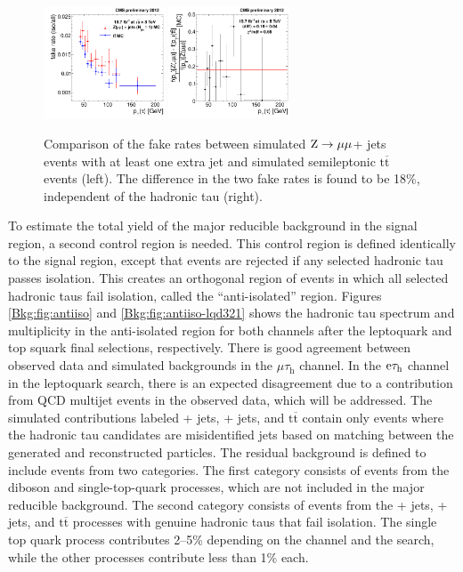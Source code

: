 \documentclass[12pt]{thesis}  %
\newcommand{\tauh}{\ensuremath{\tau_{\text{h}}}\xspace}
\newcommand{\Pe}{\ensuremath{\cmsSymbolFace{e}}\xspace}
\newcommand{\mutau}{\ensuremath{\mu\tauh}\xspace}
\newcommand{\etau}{\ensuremath{\Pe\tauh}\xspace}
\renewcommand{\ttbar}{\ensuremath{\mathrm{t}\overline{\mathrm{t}}}\xspace}
\newcommand{\ra}{\ensuremath{\rightarrow}}%
\newcommand{\Zmm}{\ensuremath{\Z \ra \mu\mu}\xspace}%
\begin{document}
\begin{figure}[hbt]
  \begin{center}
    \includegraphics[width=0.32\textwidth]{figures/bkgEstim/ttbar_fr_comp_final.pdf}
    \includegraphics[width=0.32\textwidth]{figures/bkgEstim/tfr_diff_ttbar_incl.pdf}
    \caption{Comparison of the fake rates between simulated \Zmm + jets events with at least one extra jet and simulated semileptonic \ttbar events (left). The difference in the two fake rates is found to be 18\%, independent of the hadronic tau \pt (right). \label{fig:fakeratettbardiff}}
  \end{center}
\end{figure}

To estimate the total yield of the major reducible background in the signal region, a second control region is needed. This control region is defined identically to the signal region, except that events are rejected if any selected hadronic tau passes isolation. This creates an orthogonal region of events in which all selected hadronic taus fail isolation, called the ``anti-isolated'' region. Figures \ref{Bkg:fig:antiiso} and \ref{Bkg:fig:antiiso-lqd321} shows the hadronic tau \pt spectrum and multiplicity in the anti-isolated region for both channels after the leptoquark and top squark final selections, respectively. There is good agreement between observed data and simulated backgrounds in the \mutau channel. In the \etau channel in the leptoquark search, there is an expected disagreement due to a contribution from QCD multijet events in the observed data, which will be addressed. The simulated contributions labeled \W + jets, \Z + jets, and \ttbar contain only events where the hadronic tau candidates are misidentified jets based on matching between the generated and reconstructed particles. The residual background is defined to include events from two categories. The first category consists of events from the diboson and single-top-quark processes, which are not included in the major reducible background. The second category consists of events from the \W + jets, \Z + jets, and \ttbar processes with genuine hadronic taus that fail isolation. The single top quark process contributes 2--5\% depending on the channel and the search, while the other processes contribute less than 1\% each.
\end{document}
